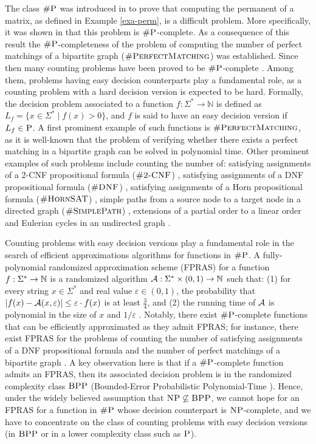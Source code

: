 
The class $\text{\sc \#P}$ was introduced in \cite{Valiant79} to prove that computing the permanent of a matrix, as defined in Example \ref{exa-perm}, is a difficult problem. More specifically, it was shown in  \cite{Valiant79}  that this problem is $\text{\sc \#P}$-complete. As a consequence of this result the $\text{\sc \#P}$-completeness of the problem of computing the number of perfect matchings of a bipartite graph ($\textsc{\#PerfectMatching}$) was established.
Since then  many counting problems have been proved to be $\text{\sc \#P}$-complete \cite{V79b,PB83,P86,L86,BW91,HMRS98,DG00,BW05,DS12, PS13,PS14}. Among them, problems having easy decision counterparts play a fundamental role, as a counting problem with a hard decision version is expected to be hard. Formally, the decision problem associated to a function $f : \Sigma^* \to \mathbb{N}$ is defined as $L_f = \{ x \in \Sigma^* \mid f(x) > 0 \}$, and $f$ is said to have an easy decision version if $L_f \in \text{\sc P}$. A first prominent example of such functions is $\textsc{\#PerfectMatching}$, as it is well-known that the problem of verifying whether there exists a perfect matching in a bipartite graph can be solved in polynomial time. Other prominent examples of such problems include counting the number of: satisfying assignments of a 2-CNF propositional formula ($\ctwcnf$) \cite{V79b}, satisfying assignments of a DNF propositional formula ($\textsc{\#DNF}$) \cite{DHK05}, satisfying assignments of a Horn  propositional formula ($\textsc{\#HornSAT}$) \cite{V79b}, simple paths from a source node to a target node in a directed graph ($\textsc{\#SimplePath}$) \cite{V79b}, extensions of a partial order to a linear order \cite{BW91} and Eulerian cycles in an undirected graph \cite{BW05}. 

Counting problems with easy decision versions play a fundamental role in the search of efficient approximations algorithms for functions in $\text{\sc \#P}$. A fully-polynomial randomized approximation scheme (FPRAS) for a function $f : \Sigma^* \to \mathbb{N}$ is a randomized algorithm ${\cal A} : \Sigma^* \times (0,1) \to \bbN$ such that: (1) for every string $x \in \Sigma^*$ and real value $\varepsilon \in (0,1)$, the probability that $|f(x) - {\cal A}(x,\varepsilon)| \leq \varepsilon \cdot f(x)$ is at least $\frac{3}{4}$, and (2) the running time of ${\cal A}$ is polynomial in the size of $x$ and $1/\varepsilon$ \cite{KL83}. Notably, there exist $\text{\sc \#P}$-complete functions that can be efficiently approximated as they admit FPRAS; for instance, there exist FPRAS for the problems of counting the number of satisfying assignments of a DNF propositional formula \cite{KL83} and the number of perfect matchings of a bipartite graph \cite{JSV04}. A key observation here is that if a $\text{\sc \#P}$-complete function admits an FPRAS, then its associated decision problem is in the randomized complexity class $\text{\sc BPP}$ (Bounded-Error Probabilistic Polynomial-Time \cite{G77}). Hence, under the widely believed assumption that  $\text{\sc NP} \not\subseteq \text{\sc BPP}$, we cannot hope for an FPRAS for a function in $\text{\sc \#P}$ whose decision counterpart is $\text{\sc NP}$-complete, and we have to concentrate on the class of counting problems with easy decision versions (in $\text{\sc BPP}$ or in a lower complexity class such as $\text{\sc P}$). 

